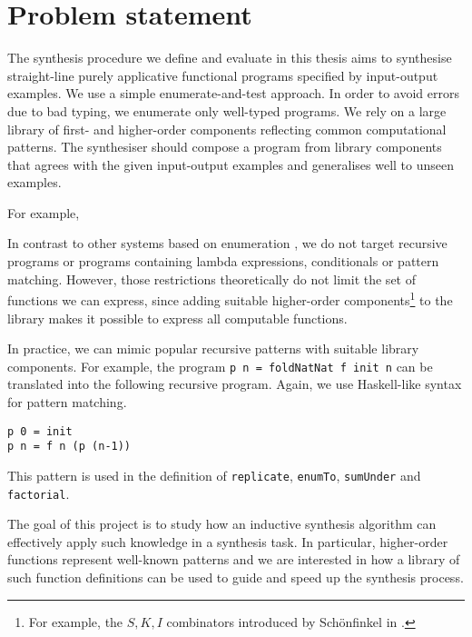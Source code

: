 \section{Problem statement}\label{Problem}

The synthesis procedure we define and evaluate in this thesis aims to synthesise straight-line purely applicative functional programs specified by input-output examples. We use a simple enumerate-and-test approach. In order to avoid errors due to bad typing, we enumerate only well-typed programs. We rely on a large library of first- and higher-order components reflecting common computational patterns.
The synthesiser should compose a program from library components that agrees with the given input-output examples and generalises well to unseen examples.

For example, 

In contrast to other systems based on enumeration \cite{MythPaper, LambdaSquarePaper}, we do not target recursive programs or programs containing lambda expressions, conditionals or pattern matching. However, those restrictions theoretically do not limit the set of functions we can express, since adding suitable higher-order components\footnote{For example, the $S, K, I$ combinators introduced by Schönfinkel in \cite{Schonfinkel1924}.} to the library makes it possible to express all computable functions.

In practice, we can mimic popular recursive patterns with suitable library components. For example, the program \lstinline!p n = foldNatNat f init n! can be translated into the following recursive program. Again, we use Haskell-like syntax for pattern matching.
\begin{lstlisting}[style=plain]
p 0 = init
p n = f n (p (n-1))
\end{lstlisting}
This pattern is used in the definition of \lstinline!replicate!, \lstinline!enumTo!, \lstinline!sumUnder! and \lstinline!factorial!.








The goal of this project is to study how an inductive synthesis algorithm can effectively apply such knowledge in a synthesis task. In particular, higher-order functions represent well-known patterns and we are interested in how a library of such function definitions can be used to guide and speed up the synthesis process.

